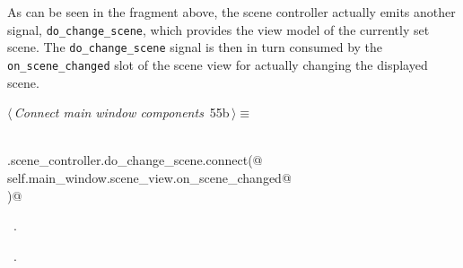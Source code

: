 \documentclass[
    a4paper,      %
    10pt,         %
    openright,    %
    notitlepage,  %
    parskip=half, %
]{scrreprt}       %
\theoremstyle{definition}                    %
\begin{document}
As can be seen in the fragment above, the scene controller actually emits
another signal, \verb+do_change_scene+, which provides the view model of the
currently set scene.
The \verb+do_change_scene+ signal is then in turn consumed by the
\verb+on_scene_changed+ slot of the scene view for actually changing the
displayed scene.

\begin{flushleft} \small
\begin{minipage}{\linewidth}\label{scrap88}\raggedright\small
{} $\langle\,${\itshape Connect main window components}\nobreak\ {\footnotesize {55b}}$\,\rangle\equiv$
\vspace{-1exm}
\begin{list}{}{} \item
\mbox{}\lstinline@@\\
\mbox{}\lstinline@self.scene_controller.do_change_scene.connect(@\\
\mbox{}\lstinline@    self.main_window.scene_view.on_scene_changed@\\
\mbox{}\lstinline@)@{\NWsep}
\end{list}
\vspace{-1.5ex}
\footnotesize
\begin{list}{}{\setlength{\itemsep}{-\parsep}\setlength{\itemindent}{-\leftmargin}}
\item \NWtxtMacroDefBy\ .
\item \NWtxtMacroRefIn\ .

\item{}
\end{list}
\end{minipage}\vspace{4ex}
\end{flushleft}
\end{document}
